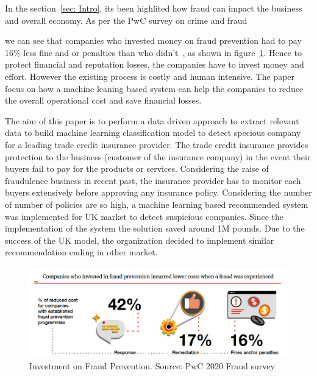 

In the section~\ref{sec: Intro}, its been highlited how fraud can impact the business and overall economy. As per the PwC survey on crime and fraud~\caption{1} we can see that companies who invested money on fraud prevention had to pay 16\% less fine and\/ or penalties than who didn't~, as shown in figure~\ref{fig:fraud_preven}. Hence to protect financial and reputation losses, the companies have to invest money and effort. However the existing process is costly and human intensive. The paper focus on how a machine leaning based system can help the companies to reduce the overall operational cost and save financial losses.

The aim of this paper is to perform a data driven approach to extract relevant data to build machine learning classification model to detect specious company for a leading trade credit insurance provider. The trade credit insurance provides protection to the business (customer of the insurance company) in the event their buyers fail to pay for the products or services. Considering the raise of fraudulence business in recent past, the insurance provider has to monitor each buyers extensively before approving any insurance policy. Considering the number of number of policies are so high, a machine learning based recommended system was implemented for UK market to detect suspicious companies. Since the implementation of the system the solution saved around 1M pounds. Due to the success of the UK model, the organization decided to implement similar recommendation ending in other market.

\begin{figure}[htp]
    \centering
    \includegraphics[width=\linewidth]{figures/prevent_fraud.PNG}
    \caption{Investment on Fraud Prevention. Source: PwC 2020 Fraud survey~\cite{PwC.Crime.Survey} }
    \label{fig:fraud_preven}
\end{figure}

